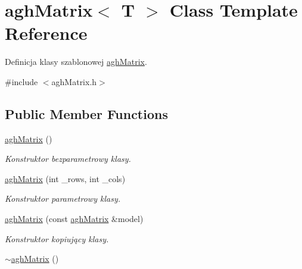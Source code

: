\hypertarget{classaghMatrix}{\section{agh\-Matrix$<$ \-T $>$ \-Class \-Template \-Reference}
\label{classaghMatrix}
}


\-Definicja klasy szablonowej \hyperlink{classaghMatrix}{agh\-Matrix}.  




{\ttfamily \#include $<$agh\-Matrix.\-h$>$}

\subsection*{\-Public \-Member \-Functions}
\begin{DoxyCompactItemize}
\item 
\hypertarget{classaghMatrix_a8e984a3f732f8ba28fae1853ccddc6bc}{\hyperlink{classaghMatrix_a8e984a3f732f8ba28fae1853ccddc6bc}{agh\-Matrix} ()}\label{classaghMatrix_a8e984a3f732f8ba28fae1853ccddc6bc}

\begin{DoxyCompactList}\small\item\em \-Konstruktor bezparametrowy klasy. \end{DoxyCompactList}\item 
\hyperlink{classaghMatrix_a4dfc131a81a48dea087a5cd981205c11}{agh\-Matrix} (int \-\_\-rows, int \-\_\-cols)
\begin{DoxyCompactList}\small\item\em \-Konstruktor parametrowy klasy. \end{DoxyCompactList}\item 
\hyperlink{classaghMatrix_a34705a2149fe42f98f124c5dd471c847}{agh\-Matrix} (const \hyperlink{classaghMatrix}{agh\-Matrix} \&model)
\begin{DoxyCompactList}\small\item\em \-Konstruktor kopiujący klasy. \end{DoxyCompactList}\item 
\hypertarget{classaghMatrix_a83066675c5a4bf2894715f4d275db65c}{\hyperlink{classaghMatrix_a83066675c5a4bf2894715f4d275db65c}{$\sim$agh\-Matrix} ()}\label{classaghMatrix_a83066675c5a4bf2894715f4d275db65c}


\end{DoxyCompactItemize}

